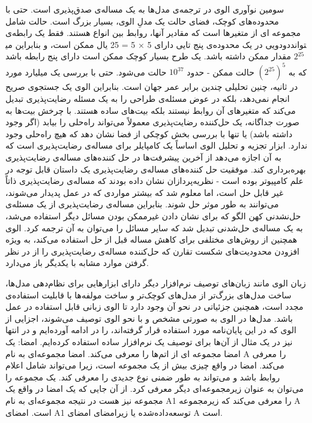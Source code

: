  سومین نوآوری الوی در ترجمه‌ی مدل‌ها به یک مساله‌ی صدق‌پذیری است. حتی با محدوده‌های کوچک، فضای حالت یک مدلِ الوی، بسیار بزرگ است. حالت شامل مجموعه ای از متغیرها است که مقادیر آنها، روابط بین انواع هستند. فقط یک رابطه‌ی دودویی در یک محدوده‌ی پنج تایی دارای 5 × 5 = 25 یال ممکن است، و بنابراین می‎تواند
$2 ‌^ {25} $
 مقدار ممکن داشته باشد. یک طرح بسیار کوچک ممکن است دارای پنج رابطه باشد که به
$(2 ^ {25}) ^ 5 $
 حالت ممکن - حدود
$10 ^ {37} $
  حالت می‌شود. حتی با بررسی یک میلیارد مورد در ثانیه، چنین تحلیلی چندین برابر عمر جهان است. بنابراین الوی یک جستجوی صریح انجام نمی‌دهد، بلکه در عوض مسئله‌ی طراحی را به یک مسئله رضایت‌پذیری تبدیل می‌کند که متغیرهای آن روابط نیستند بلکه بیت‌های ساده هستند. با چرخش بیت‌ها به صورت جداگانه، یک حل‌کننده رضایت‌پذیری معمولاً می‌تواند راه‌حلی را بیابد (اگر وجود داشته باشد) یا تنها با بررسی بخش کوچکی از فضا نشان دهد که هیچ راه‌حلی وجود ندارد. ابزار تجزیه و تحلیل الوی اساساً یک کامپایلر برای مساله‌ی رضایت‌پذیری است که به آن اجازه می‌دهد از آخرین پیشرفت‌ها در حل کننده‌های مساله‌ی رضایت‌پذیری بهره‌برداری کند. موفقیت حل کننده‌های مساله‌ی رضایت‌پذیری یک داستان قابل توجه در علم کامپیوتر بوده است - نظریه‌پردازان نشان داده بودند که مساله‌ی رضایت‌پذیری ذاتاً غیر قابل حل است، اما معلوم شد که بیشتر مواردی که در عمل پدیدار می‌شوند، می‌توانند به طور موثر حل شوند. بنابراین مساله‌ی رضایت‌پذیری از یک مسئله‌ی حل‌نشدنی کهن الگو که برای نشان دادن غیرممکن بودن مسائل دیگر استفاده می‌شد، به یک مساله‌ی حل‌شدنی تبدیل شد که سایر مسائل را می‌توان به آن ترجمه کرد. الوی همچنین از روش‌های مختلفی برای کاهش مساله‌ قبل از حل استفاده می‌کند، به ویژه افزودن محدودیت‌های شکست تقارن که حل‌کننده مساله‌ی رضایت‌پذیری را از در نظر گرفتن موارد مشابه با یکدیگر باز ‌می‌دارد.

زبان الوی مانند زبان‌های توصیف نرم‌افزار دیگر دارای ابزارهایی برای نظام‌دهی مدل‌ها، ساخت مدل‌های بزرگ‌تر از مدل‌های کوچک‌تر و ساخت مولفه‌ها با قابلیت استفاده‌ی مجدد است، همچنین جزئیاتی در نحو آن وجود دارد تا الوی زبانی قابل استفاده در عمل باشد. 
مدل‌ها در الوی به صورتی مشخص و با نحو الوی توصیف می‌شوند، اجزایی از الوی که در این پایان‌نامه مورد استفاده قرار گرفته‌اند، را در ادامه آورده‌ایم و در انتها نیز در یک مثال از آن‌ها برای توصیف یک نرم‌افزار ساده استفاده کرده‌ایم.
امضا: یک امضا مجموعه ای از اتم‌ها را معرفی می‌کند. امضا
مجموعه‌ای به نام A را معرفی می‌کند. امضا در واقع چیزی بیش از یک مجموعه است، زیرا می‌تواند شامل اعلام روابط باشد و می‌تواند به طور ضمنی نوع جدیدی را معرفی کند.
یک مجموعه را می‌توان به عنوان زیرمجموعه‌ای دیگر معرفی کرد. از آن جایی که یک امضا در واقع یک مجموعه نیز هست در نتیجه
مجموعه‌ای به نام A1 را معرفی می‌کند که زیرمجموعه A است. امضای A1 توسعه‌داده‌شده یا زیرامضای امضای A است.

